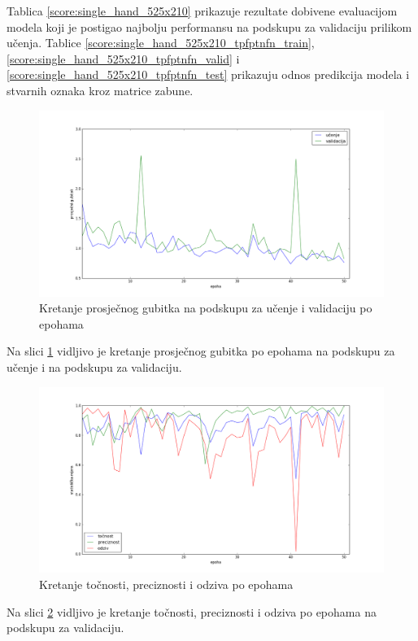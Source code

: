 \documentclass[times, utf8, diplomski, numeric]{fer}
\begin{document}
\noindent Tablica \ref{score:single_hand_525x210} prikazuje rezultate dobivene evaluacijom modela koji je postigao najbolju performansu na podskupu za validaciju prilikom učenja.
Tablice \ref{score:single_hand_525x210_tpfptnfn_train}, \ref{score:single_hand_525x210_tpfptnfn_valid} i \ref{score:single_hand_525x210_tpfptnfn_test} prikazuju odnos predikcija modela i stvarnih oznaka kroz matrice zabune.

\begin{figure}[H]
\centering
\includegraphics[scale=0.35]{images/single_hand_scale075_loss.png}
\caption{Kretanje prosječnog gubitka na podskupu za učenje i validaciju po epohama}
\label{img:single_hand_scale075_loss}
\end{figure}
\noindent Na slici \ref{img:single_hand_scale075_loss} vidljivo je kretanje prosječnog gubitka po epohama na podskupu za učenje i na podskupu za validaciju.

\begin{figure}[H]
\centering
\includegraphics[scale=0.35]{images/single_hand_scale075_acc_ap.png}
\caption{Kretanje točnosti, preciznosti i odziva po epohama}
\label{img:single_hand_scale075_acc_ap}
\end{figure}
\noindent Na slici \ref{img:single_hand_scale075_acc_ap} vidljivo je kretanje točnosti, preciznosti i odziva po epohama na podskupu za validaciju.
\end{document}
